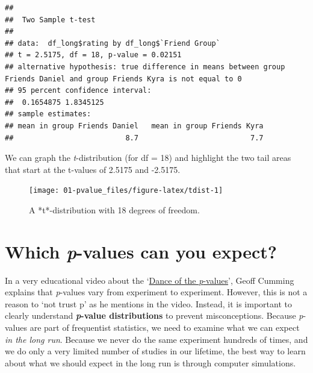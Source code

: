 \documentclass[
  oneside]{book}
\newenvironment{Shaded}{\begin{snugshade}}{\end{snugshade}}
\newcommand{\AttributeTok}[1]{\textcolor[rgb]{0.77,0.63,0.00}{#1}}
\newcommand{\ConstantTok}[1]{\textcolor[rgb]{0.00,0.00,0.00}{#1}}
\newcommand{\FunctionTok}[1]{\textcolor[rgb]{0.00,0.00,0.00}{#1}}
\newcommand{\NormalTok}[1]{#1}
\newcommand{\SpecialCharTok}[1]{\textcolor[rgb]{0.00,0.00,0.00}{#1}}
\newcommand{\StringTok}[1]{\textcolor[rgb]{0.31,0.60,0.02}{#1}}
\begin{document}
\begin{Shaded}
\end{Shaded}

\begin{verbatim}
## 
##  Two Sample t-test
## 
## data:  df_long$rating by df_long$`Friend Group`
## t = 2.5175, df = 18, p-value = 0.02151
## alternative hypothesis: true difference in means between group Friends Daniel and group Friends Kyra is not equal to 0
## 95 percent confidence interval:
##  0.1654875 1.8345125
## sample estimates:
## mean in group Friends Daniel   mean in group Friends Kyra 
##                          8.7                          7.7
\end{verbatim}

We can graph the \emph{t}-distribution (for df = 18) and highlight the two tail areas that start at the t-values of 2.5175 and -2.5175.

\begin{figure}

{\centering \texttt{[image: 01-pvalue\_files/figure-latex/tdist-1]} 

}

\caption{A *t*-distribution with 18 degrees of freedom.}\label{fig:tdist}
\end{figure}

\hypertarget{which-p-values-can-you-expect}{%
\section{\texorpdfstring{Which \emph{p}-values can you expect?}{Which p-values can you expect?}}\label{which-p-values-can-you-expect}}

In a very educational video about the `\href{https://www.youtube.com/watch?v=5OL1RqHrZQ8}{Dance of the \emph{p}-values}', Geoff Cumming explains that \emph{p}-values vary from experiment to experiment. However, this is not a reason to `not trust p' as he mentions in the video. Instead, it is important to clearly understand \textbf{\emph{p}-value distributions} to prevent misconceptions. Because \emph{p}-values are part of frequentist statistics, we need to examine what we can expect \emph{in the long run}. Because we never do the same experiment hundreds of times, and we do only a very limited number of studies in our lifetime, the best way to learn about what we should expect in the long run is through computer simulations.
\end{document}
